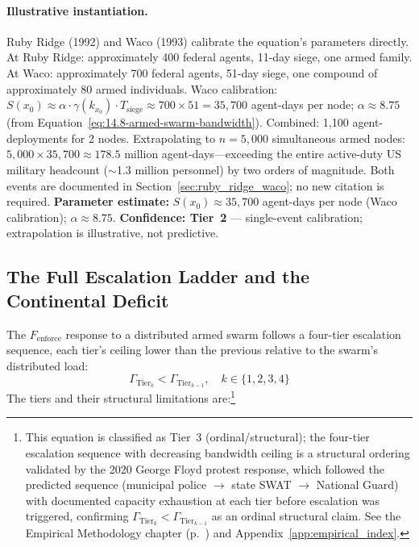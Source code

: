 \paragraph{Illustrative instantiation.}
Ruby Ridge (1992) and Waco (1993) calibrate the equation's parameters directly. At Ruby Ridge: approximately 400 federal agents, 11-day siege, one armed family. At Waco: approximately 700 federal agents, 51-day siege, one compound of approximately 80 armed individuals. Waco calibration: $S(x_0) \approx \alpha \cdot \gamma(k_{x_0}) \cdot T_{\text{siege}} \approx 700 \times 51 = 35{,}700$ agent-days per node; $\alpha \approx 8.75$ (from Equation~\eqref{eq:14.8-armed-swarm-bandwidth}). Combined: 1,100 agent-deployments for 2 nodes. Extrapolating to $n = 5{,}000$ simultaneous armed nodes: $5{,}000 \times 35{,}700 \approx 178.5$ million agent-days---exceeding the entire active-duty US military headcount ($\sim$1.3 million personnel) by two orders of magnitude. Both events are documented in Section~\ref{sec:ruby_ridge_waco}; no new citation is required. \textbf{Parameter estimate:} $S(x_0) \approx 35{,}700$ agent-days per node (Waco calibration); $\alpha \approx 8.75$. \textbf{Confidence: Tier~2} --- single-event calibration; extrapolation is illustrative, not predictive.

\subsection{The Full Escalation Ladder and the Continental Deficit}
\label{subsec:escalation_ladder}

The $F_{\text{enforce}}$ response to a distributed armed swarm follows a four-tier escalation sequence, each tier's ceiling lower than the previous relative to the swarm's distributed load:
\begin{equation}\label{eq:14.11-escalation-ceiling-tiers}
\Gamma_{\text{Tier}_k} < \Gamma_{\text{Tier}_{k-1}}, \quad k \in \{1,2,3,4\}
\end{equation}
The tiers and their structural limitations are:\footnote{This equation is classified as Tier~3 (ordinal/structural); the four-tier escalation sequence with decreasing bandwidth ceiling is a structural ordering validated by the 2020 George Floyd protest response, which followed the predicted sequence (municipal police $\to$ state SWAT $\to$ National Guard) with documented capacity exhaustion at each tier before escalation was triggered, confirming $\Gamma_{\text{Tier}_k} < \Gamma_{\text{Tier}_{k-1}}$ as an ordinal structural claim. See the Empirical Methodology chapter (p.~\pageref{ch:empirical_methodology}) and Appendix~\ref{app:empirical_index}.}

